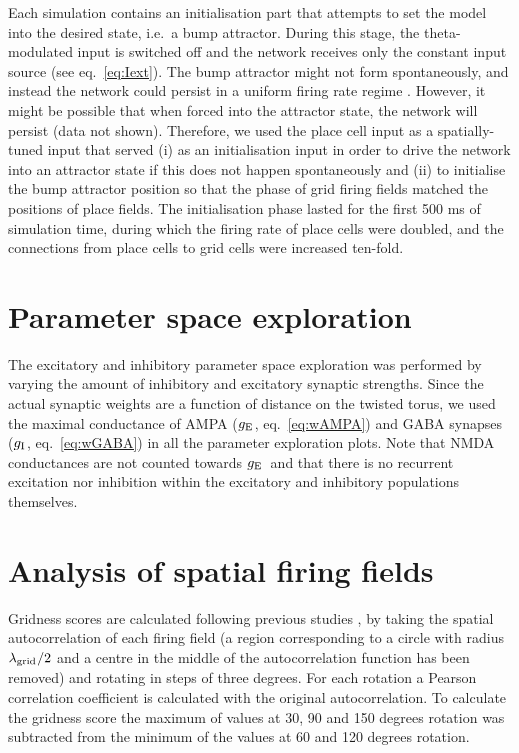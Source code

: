 \documentclass[a4paper,12pt]{article}
\newcommand{\ssc}[3]{\ensuremath{#1_{\text{#2}_{\text{#3}}}}}
\newcommand{\gE      }{\ssc{g}      {\scriptsize{E}}{}}
\newcommand{\gI      }{\ssc{g}      {\scriptsize{I}}{}}
\newcommand{\lamgrid}{\ssc{\lambda}{\scriptsize{grid}}{}}
\begin{document}
Each simulation contains an initialisation part that attempts to set the model
into the desired state, i.e.\ a bump attractor. During this stage, the
theta-modulated input is switched off and the network receives only the
constant input source (see eq.~\ref{eq:Iext}). The bump attractor might not
form spontaneously, and instead the network could persist in a  uniform firing
rate regime \citep{Compte:2000ul}. However, it might be possible that when
forced into the attractor state, the network will persist (data not shown).
Therefore, we used the place cell input as a spatially-tuned input that served
(i) as an initialisation input in order to drive the network into an attractor
state if this does not happen spontaneously and (ii) to initialise the bump
attractor position so that the phase of grid firing fields matched the positions
of place fields. The initialisation phase lasted for the first 500 ms of
simulation time, during which the firing rate of place cells were doubled, and
the connections from place cells to grid cells were increased ten-fold.



\section{Parameter space exploration} \label{sec:param_sweeps}

The excitatory and inhibitory parameter space exploration was performed by
varying the amount of inhibitory and excitatory synaptic strengths. Since the
actual synaptic weights are a function of distance on the twisted torus, we
used the maximal conductance of AMPA ($\gE$, eq.~\ref{eq:wAMPA}) and GABA
synapses ($\gI$, eq.~\ref{eq:wGABA}) in all the parameter exploration plots.
Note that NMDA conductances are not counted towards $\gE$\ and that there is no
recurrent excitation nor inhibition within the excitatory and inhibitory
populations themselves.



\section{Analysis of spatial firing fields}

Gridness scores are calculated following previous studies
\citep{Sargolini:2006ba}, by taking the spatial autocorrelation of each firing
field (a region corresponding to a circle with radius $\lamgrid/2$ and a centre
in the middle of the autocorrelation function has been removed) and rotating in
steps of three degrees. For each rotation a Pearson correlation coefficient is
calculated with the original autocorrelation. To calculate the gridness score
the maximum of values at 30, 90 and 150 degrees rotation was subtracted from
the minimum of the values at 60 and 120 degrees rotation.
\end{document}
